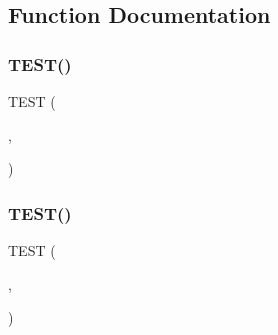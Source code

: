\subsection{Function Documentation}
\mbox{\label{_obj__test_2lib_2googletest-master_2googlemock_2test_2gmock__link__test_8h_a2a241b93f4367065a763c7df5133e5b6}} 
\subsubsection{\texorpdfstring{TEST()}{TEST()}\hspace{0.1cm}{\footnotesize\ttfamily [1/47]}}
{\footnotesize\ttfamily T\+E\+ST (\begin{DoxyParamCaption}\item[{\mbox{\hyperlink{_obj__test_2lib_2googletest-release-1_88_81_2googlemock_2test_2gmock__link__test_8cc_afb3d3e7fd53242710a55460595d750bb}{Link\+Test}}}]{,  }\item[{Test\+Return\+Void}]{ }\end{DoxyParamCaption})}

\mbox{\label{_obj__test_2lib_2googletest-master_2googlemock_2test_2gmock__link__test_8h_a7fc9e5ba927fb0b787c401830d96e845}} 
\subsubsection{\texorpdfstring{TEST()}{TEST()}\hspace{0.1cm}{\footnotesize\ttfamily [2/47]}}
{\footnotesize\ttfamily T\+E\+ST (\begin{DoxyParamCaption}\item[{\mbox{\hyperlink{_obj__test_2lib_2googletest-release-1_88_81_2googlemock_2test_2gmock__link__test_8cc_afb3d3e7fd53242710a55460595d750bb}{Link\+Test}}}]{,  }\item[{Test\+Return}]{ }\end{DoxyParamCaption})}

\mbox{\label{_obj__test_2lib_2googletest-master_2googlemock_2test_2gmock__link__test_8h_adac5a0d25e665298c61d73103f6b4ef6}} 
